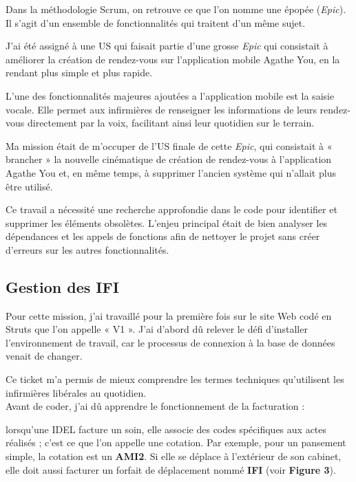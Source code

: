 \documentclass{article}
\begin{document}
Dans la méthodologie Scrum, on retrouve ce que l'on nomme une épopée (\textit{Epic}). Il s'agit d'un ensemble de fonctionnalités qui traitent d'un même sujet.

J'ai été assigné à une US qui faisait partie d'une grosse \textit{Epic} qui consistait à améliorer la création de rendez-vous sur l'application mobile Agathe You, en la rendant plus simple et plus rapide.

L'une des fonctionnalités majeures ajoutées a l'application mobile est la saisie vocale. Elle permet aux infirmières de renseigner les informations de leurs rendez-vous directement par la voix, facilitant ainsi leur quotidien sur le terrain.

Ma mission était de m'occuper de l'US finale de cette \textit{Epic}, qui consistait à « brancher » la nouvelle cinématique de création de rendez-vous à l'application Agathe You et, en même temps, à supprimer l'ancien système qui n'allait plus être utilisé.

Ce travail a nécessité une recherche approfondie dans le code pour identifier et supprimer les éléments obsolètes. L'enjeu principal était de bien analyser les dépendances et les appels de fonctions afin de nettoyer le projet sans créer d'erreurs sur les autres fonctionnalités.

\newpage

\subsection{Gestion des IFI}

Pour cette mission, j'ai travaillé pour la première fois sur le site Web codé en Struts que l'on appelle « V1 ». J'ai d'abord dû relever le défi d'installer l'environnement de travail, car le processus de connexion à la base de données venait de changer.

Ce ticket m'a permis de mieux comprendre les termes techniques qu'utilisent les infirmières libérales au quotidien.\\

Avant de coder, j'ai dû apprendre le fonctionnement de la facturation :

lorsqu'une IDEL facture un soin, elle associe des codes spécifiques aux actes réalisés ; c'est ce que l'on appelle une cotation. Par exemple, pour un pansement simple, la cotation est un \textbf{AMI2}. Si elle se déplace à l'extérieur de son cabinet, elle doit aussi facturer un forfait de déplacement nommé \textbf{IFI} (voir \textbf{Figure 3}).\\
\end{document}
